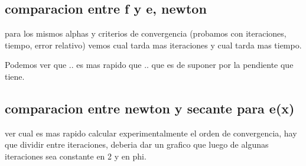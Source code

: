 \subsection{comparacion entre f y e, newton}

para los mismos alphas y criterios de convergencia (probamos con iteraciones,
tiempo, error relativo) vemos cual tarda mas iteraciones y cual tarda mas
tiempo.

Podemos ver que .. es mas rapido que .. que es de suponer por la pendiente que
tiene.

\subsection{comparacion entre newton y secante para e(x)}

ver cual es mas rapido
calcular experimentalmente el orden de convergencia, hay que dividir entre
iteraciones, deberia dar un grafico que luego de algunas iteraciones sea
constante en 2 y en phi.
